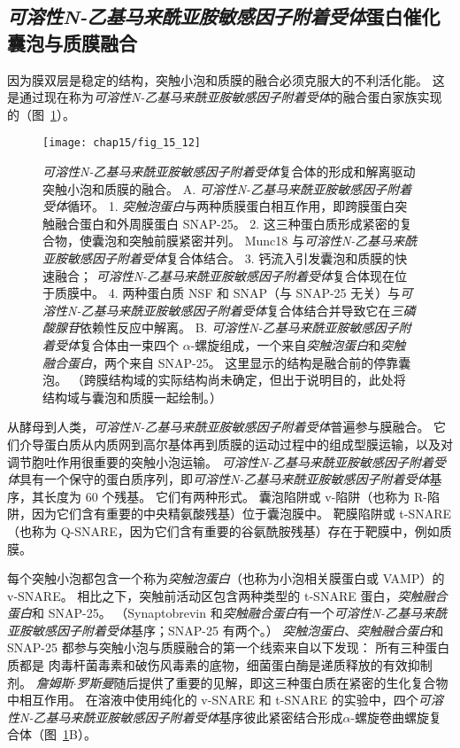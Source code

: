 \subsection{\textit{可溶性N-乙基马来酰亚胺敏感因子附着受体}蛋白催化囊泡与质膜融合}

因为膜双层是稳定的结构，突触小泡和质膜的融合必须克服大的不利活化能。
这是通过现在称为\textit{可溶性N-乙基马来酰亚胺敏感因子附着受体}的融合蛋白家族实现的（图~\ref{fig:15_12}）。


\begin{figure}[htbp]
	\centering
	\texttt{[image: chap15/fig\_15\_12]}
	\caption{\textit{可溶性N-乙基马来酰亚胺敏感因子附着受体}复合体的形成和解离驱动突触小泡和质膜的融合\cite{rizo2002snares}。
		 A. \textit{可溶性N-乙基马来酰亚胺敏感因子附着受体}循环。
		 1. \textit{突触泡蛋白}与两种质膜蛋白相互作用，即跨膜蛋白突触融合蛋白和外周膜蛋白 SNAP-25。
		 2. 这三种蛋白质形成紧密的复合物，使囊泡和突触前膜紧密并列。
		 Munc18 与\textit{可溶性N-乙基马来酰亚胺敏感因子附着受体}复合体结合。
		 3. 钙流入引发囊泡和质膜的快速融合；
		 \textit{可溶性N-乙基马来酰亚胺敏感因子附着受体}复合体现在位于质膜中。
		 4. 两种蛋白质 NSF 和 SNAP（与 SNAP-25 无关）与\textit{可溶性N-乙基马来酰亚胺敏感因子附着受体}复合体结合并导致它在\textit{三磷酸腺苷}依赖性反应中解离。
		 B. \textit{可溶性N-乙基马来酰亚胺敏感因子附着受体}复合体由一束四个 $\alpha$-螺旋组成，一个来自\textit{突触泡蛋白}和\textit{突触融合蛋白}，两个来自 SNAP-25。
		 这里显示的结构是融合前的停靠囊泡。
		 （跨膜结构域的实际结构尚未确定，但出于说明目的，此处将结构域与囊泡和质膜一起绘制。）}
	\label{fig:15_12}
\end{figure}


从酵母到人类，\textit{可溶性N-乙基马来酰亚胺敏感因子附着受体}普遍参与膜融合。
它们介导蛋白质从内质网到高尔基体再到质膜的运动过程中的组成型膜运输，以及对调节胞吐作用很重要的突触小泡运输。
\textit{可溶性N-乙基马来酰亚胺敏感因子附着受体}具有一个保守的蛋白质序列，即\textit{可溶性N-乙基马来酰亚胺敏感因子附着受体}基序，其长度为 60 个残基。
它们有两种形式。
囊泡陷阱或 v-陷阱（也称为 R-陷阱，因为它们含有重要的中央精氨酸残基）位于囊泡膜中。
靶膜陷阱或 t-SNARE（也称为 Q-SNARE，因为它们含有重要的谷氨酰胺残基）存在于靶膜中，例如质膜。


每个突触小泡都包含一个称为\textit{突触泡蛋白}（也称为小泡相关膜蛋白或 VAMP）的 v-SNARE。
相比之下，突触前活动区包含两种类型的 t-SNARE 蛋白，\textit{突触融合蛋白}和 SNAP-25。
（Synaptobrevin 和\textit{突触融合蛋白}有一个\textit{可溶性N-乙基马来酰亚胺敏感因子附着受体}基序；SNAP-25 有两个。）
\textit{突触泡蛋白}、\textit{突触融合蛋白}和 SNAP-25 都参与突触小泡与质膜融合的第一个线索来自以下发现：
所有三种蛋白质都是 肉毒杆菌毒素和破伤风毒素的底物，细菌蛋白酶是递质释放的有效抑制剂。
\textit{詹姆斯$\cdot$罗斯曼}随后提供了重要的见解，即这三种蛋白质在紧密的生化复合物中相互作用。
在溶液中使用纯化的 v-SNARE 和 t-SNARE 的实验中，四个\textit{可溶性N-乙基马来酰亚胺敏感因子附着受体}基序彼此紧密结合形成$\alpha$-螺旋卷曲螺旋复合体（图~\ref{fig:15_12}B）。


